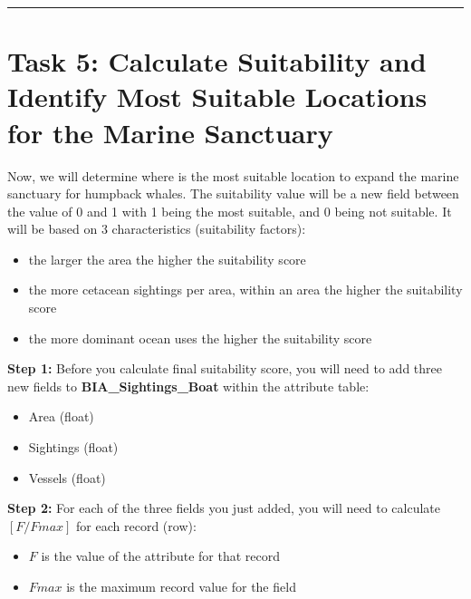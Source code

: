 \documentclass[
]{book}
\providecommand{\tightlist}{%
  \setlength{\itemsep}{0pt}\setlength{\parskip}{0pt}}
\begin{document}
\begin{center}\rule{0.5\linewidth}{0.5pt}\end{center}

\hypertarget{task-5-calculate-suitability-and-identify-most-suitable-locations-for-the-marine-sanctuary}{%
\section*{Task 5: Calculate Suitability and Identify Most Suitable Locations for the Marine Sanctuary}\label{task-5-calculate-suitability-and-identify-most-suitable-locations-for-the-marine-sanctuary}}

Now, we will determine where is the most suitable location to expand the marine sanctuary for humpback whales. The suitability value will be a new field between the value of 0 and 1 with 1 being the most suitable, and 0 being not suitable. It will be based on 3 characteristics (suitability factors):

\begin{itemize}
\tightlist
\item
  the larger the area the higher the suitability score
\item
  the more cetacean sightings per area, within an area the higher the suitability score
\item
  the more dominant ocean uses the higher the suitability score
\end{itemize}

\textbf{Step 1:} Before you calculate final suitability score, you will need to add three new fields to \textbf{BIA\_Sightings\_Boat} within the attribute table:

\begin{itemize}
\tightlist
\item
  Area (float)
\item
  Sightings (float)
\item
  Vessels (float)
\end{itemize}

\textbf{Step 2:} For each of the three fields you just added, you will need to calculate \([F /Fmax]\) for each record (row):

\begin{itemize}
\tightlist
\item
  \(F\) is the value of the attribute for that record
\item
  \(Fmax\) is the maximum record value for the field
\end{itemize}
\end{document}
